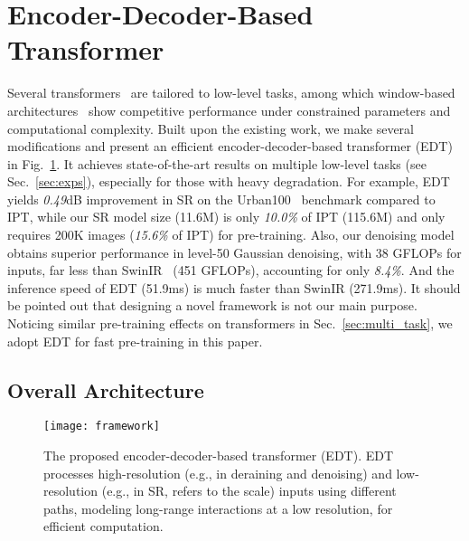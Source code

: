 \documentclass[runningheads]{llncs}
\makeatletter
\newcommand*{\eg}{e.g.\@\xspace}
\makeatother
\begin{document}
	\section{Encoder-Decoder-Based Transformer}
	
	Several transformers~\cite{chen2021pre,liang2021swinir,wang2021uformer} are tailored to low-level tasks, among which window-based architectures~\cite{liang2021swinir,wang2021uformer} show competitive performance under constrained parameters and computational complexity. Built upon the existing work, we make several modifications and present an efficient encoder-decoder-based transformer (EDT) in Fig.~\ref{fig:framework}. It achieves state-of-the-art results on multiple low-level tasks (see Sec.~\ref{sec:exps}), especially for those with heavy degradation. For example, EDT yields \textit{0.49}dB improvement in  SR on the Urban100~\cite{huang2015single} benchmark compared to IPT, while our  SR model size (11.6M) is only \textit{10.0\%} of IPT (115.6M) and only requires 200K images (\textit{15.6\%} of IPT) for pre-training. Also, our denoising model obtains superior performance in level-50 Gaussian denoising, with 38 GFLOPs for  inputs, far less than SwinIR~\cite{liang2021swinir} (451 GFLOPs), accounting for only \textit{8.4\%}. And the inference speed of EDT (51.9ms) is much faster than SwinIR (271.9ms). It should be pointed out that designing a novel framework is not our main purpose. Noticing similar pre-training effects on transformers in Sec.~\ref{sec:multi_task}, we adopt EDT for fast pre-training in this paper. 

	\subsection{Overall Architecture}
	
	\begin{figure}[t]
		\begin{center}
			\texttt{[image: framework]}
		\end{center}
		\vspace{-0.2in}
		\caption{The proposed encoder-decoder-based transformer (EDT). EDT processes high-resolution (\eg, in deraining and denoising) and low-resolution (\eg, in SR,  refers to the scale) inputs using different paths, modeling long-range interactions at a low resolution, for efficient computation.} \label{fig:framework}
		\vspace{-0.1in}
	\end{figure}
	
\end{document}

